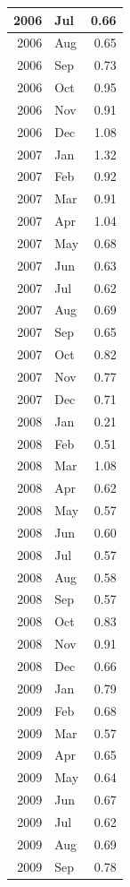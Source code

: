 \documentclass[
]{article}
\begin{document}
\begin{table}[H]
\begin{tabular}[t]{r|l|r}
\hline
2006 & Jul & 0.66\\
\hline
2006 & Aug & 0.65\\
\hline
2006 & Sep & 0.73\\
\hline
2006 & Oct & 0.95\\
\hline
2006 & Nov & 0.91\\
\hline
2006 & Dec & 1.08\\
\hline
2007 & Jan & 1.32\\
\hline
2007 & Feb & 0.92\\
\hline
2007 & Mar & 0.91\\
\hline
2007 & Apr & 1.04\\
\hline
2007 & May & 0.68\\
\hline
2007 & Jun & 0.63\\
\hline
2007 & Jul & 0.62\\
\hline
2007 & Aug & 0.69\\
\hline
2007 & Sep & 0.65\\
\hline
2007 & Oct & 0.82\\
\hline
2007 & Nov & 0.77\\
\hline
2007 & Dec & 0.71\\
\hline
2008 & Jan & 0.21\\
\hline
2008 & Feb & 0.51\\
\hline
2008 & Mar & 1.08\\
\hline
2008 & Apr & 0.62\\
\hline
2008 & May & 0.57\\
\hline
2008 & Jun & 0.60\\
\hline
2008 & Jul & 0.57\\
\hline
2008 & Aug & 0.58\\
\hline
2008 & Sep & 0.57\\
\hline
2008 & Oct & 0.83\\
\hline
2008 & Nov & 0.91\\
\hline
2008 & Dec & 0.66\\
\hline
2009 & Jan & 0.79\\
\hline
2009 & Feb & 0.68\\
\hline
2009 & Mar & 0.57\\
\hline
2009 & Apr & 0.65\\
\hline
2009 & May & 0.64\\
\hline
2009 & Jun & 0.67\\
\hline
2009 & Jul & 0.62\\
\hline
2009 & Aug & 0.69\\
\hline
2009 & Sep & 0.78\\

\end{tabular}
\end{table}
\end{document}
